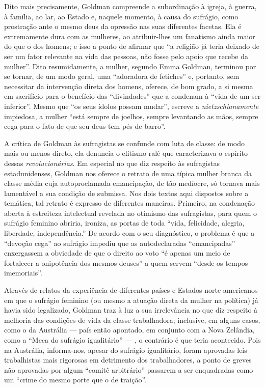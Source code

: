Dito mais precisamente,
Goldman compreende a subordinação à igreja, à guerra, à família, ao lar,
ao Estado e, naquele momento, à causa do sufrágio, como prostração ante
o mesmo deus da opressão nas suas diferentes facetas. Ela é extremamente
dura com as mulheres, ao atribuir-lhes um fanatismo ainda maior do que o
dos homens; e isso a ponto de afirmar que ``a religião já teria deixado
de ser um fator relevante na vida das pessoas, não fosse pelo apoio que
recebe da mulher''. Dito resumidamente, a mulher, segundo Emma Goldman,
terminou por se tornar, de um modo geral, uma ``adoradora de fetiches''
e, portanto, sem necessitar da intervenção direta dos homens, oferece,
de bom grado, a si mesma em sacrifício para o benefício das
``divindades'' que a condenam à ``vida de um ser inferior''. Mesmo que
``os seus ídolos possam mudar'', escreve a \textit{nietzschianamente} impiedosa,
a mulher ``está sempre de joelhos, sempre levantando as mãos, sempre
cega para o fato de que seu deus tem pés de barro''.

A crítica de Goldman às sufragistas se confunde com luta de classe: de
modo mais ou menos direto, ela denuncia o elitismo ralé que
caracterizava o espírito dessas \textit{revolucionárias}. Em especial no que
diz respeito às sufragistas estadunidenses, Goldman nos oferece o
retrato de uma típica mulher branca da classe média cuja autoproclamada
emancipação, de tão medíocre, só tornava mais lamentável a sua condição
de submissa. Nos dois textos aqui dispostos sobre a temática, tal
retrato é expresso de diferentes maneiras. Primeiro, na condenação
aberta à estreiteza intelectual revelada no otimismo das sufragistas,
para quem o sufrágio feminino abriria, ironiza, as portas de toda
``vida, felicidade, alegria, liberdade, independência.'' De acordo com o
seu diagnóstico, o problema é que a ``devoção cega'' ao sufrágio impediu
que as autodeclaradas ``emancipadas'' enxergassem a obviedade de que o
direito ao voto ``é apenas um meio de fortalecer a onipotência dos
mesmos deuses'' a quem servem ``desde os tempos imemoriais''.

Através de relatos da experiência de diferentes países e Estados
norte-americanos em que o sufrágio feminino (ou mesmo a atuação direta
da mulher na política) já havia sido legalizado, Goldman traz à luz a
sua irrelevância no que diz respeito à melhoria das condições de vida da
classe trabalhadora; inclusive, em alguns casos, como o da Austrália ---
país então apontado, em conjunto com a Nova Zelândia, como a ``Meca do
sufrágio igualitário'' --- , o contrário é que teria acontecido. Pois na
Austrália, informa-nos, apesar do sufrágio igualitário, foram
aprovadas leis trabalhistas mais rigorosas em detrimento dos
trabalhadores, a ponto de greves não aprovadas por algum ``comitê
arbitrário'' passarem a ser enquadradas como um ``crime do mesmo porte
que o de traição''. 

